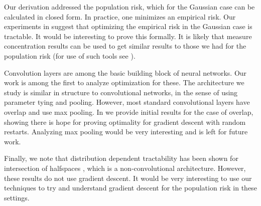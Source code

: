 Our derivation addressed the population risk, which for the Gaussian case can be calculated in closed form. In practice, one minimizes an empirical risk. Our experiments in  suggest that optimizing the empirical risk in the Gaussian case is tractable. It would be interesting to prove this formally. It is likely that measure concentration results can be used to get similar results to those we had for the population risk (for use of such tools see \cite{mei2016landscape,xu2016global}).

Convolution layers are among the basic building block of neural networks. Our work is among the first to analyze optimization for these. The architecture we study is similar in structure to convolutional networks, in the sense
of using parameter tying and pooling. However, most standard convolutional layers have overlap and use max pooling. In  we provide initial results for the case of overlap, showing there is hope for proving 
optimality for gradient descent with random restarts. Analyzing max pooling would be very interesting and is left for future work. 

Finally, we note that distribution dependent tractability has been shown for intersection of halfspaces \cite{klivans2009baum}, which is a non-convolutional architecture. However, these results do not use gradient descent. It would be very interesting to use our techniques to try and understand gradient descent for the population risk in these settings.    
\fi
